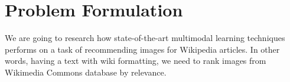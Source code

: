 \section{Problem Formulation}
We are going to research how state-of-the-art multimodal learning techniques performs on a task of recommending images for Wikipedia articles. In other words, having a text with wiki formatting, we need to rank images from Wikimedia Commons database\cite{ref_wiki_commons} by relevance.

\endinput